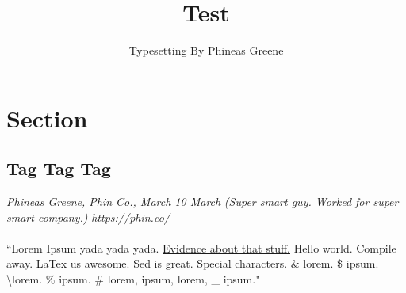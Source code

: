 \documentclass{article}
\author{Typesetting By Phineas Greene}
\title{Test}
\begin{document}
\maketitle
\tableofcontents
\newpage
{}
\section{Section}
\subsection{Tag Tag Tag}
\textit{\ul{Phineas Greene, Phin Co., March 10 March}}
\textit{(Super smart guy. Worked for super smart company.)}
\textit{\url{https://phin.co/}}
\paragraph{}``Lorem Ipsum yada yada yada. \ul{Evidence about that stuff.} Hello world. Compile away. LaTex us awesome. Sed is great. Special characters. \& lorem. \$ ipsum. \textbackslash  lorem. \% ipsum. \# lorem, { ipsum, } lorem, \_ ipsum."
\end{document}
